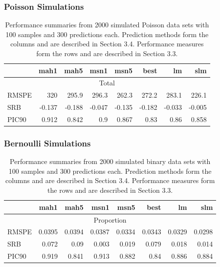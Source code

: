 \documentclass[mathserif,compress]{beamer}\usepackage{graphicx, color}
\begin{document}
\begin{frame}[fragile]
\frametitle{Poisson Simulations}


\begin{table}[ht]
\caption{\tiny Performance summaries from 2000 simulated Poisson data sets with 100 samples and 300 predictions each. Prediction methods form the columns and are described in Section 3.4.  Performance measures form the rows and are described in Section 3.3. \label{POISsummary}}
\scriptsize
\begin{center}
\begin{tabular}{|l r r r r r r r|}
\hline
\hline
  & mah1 & mah5 & msn1 & msn5 & best & lm & slm \\
\hline
\hline
\multicolumn{8}{|c|}{Total} \\
RMSPE & 320 & 295.9 & 296.3 & 262.3 & 272.2 & 283.1 & 226.1 \\
SRB & -0.137 & -0.188 & -0.047 & -0.135 & -0.182 & -0.033 & -0.005 \\
PIC90 & 0.912 & 0.842 & 0.9 & 0.867 & 0.83 & 0.86 & 0.858 \\
\hline
\end{tabular}
\end{center}
\end{table}%

\end{frame}

\begin{frame}[fragile]
\frametitle{Bernoulli Simulations}


\begin{table}[ht]
\caption{\tiny Performance summaries from 2000 simulated binary data sets with 100 samples and 300 predictions each. Prediction methods form the columns and are described in Section 3.4.  Performance measures form the rows and are described in Section 3.3. \label{BERNsummary}}
\scriptsize
\begin{center}
\begin{tabular}{|l r r r r r r r|}
\hline
\hline
  & mah1 & mah5 & msn1 & msn5 & best & lm & slm \\
\hline
\hline
\multicolumn{8}{|c|}{Proportion} \\
RMSPE & 0.0395 & 0.0394 & 0.0387 & 0.0334 & 0.0343 & 0.0329 & 0.0298 \\
SRB & 0.072 & 0.09 & 0.003 & 0.019 & 0.079 & 0.018 & 0.014 \\
PIC90 & 0.919 & 0.841 & 0.913 & 0.882 & 0.84 & 0.886 & 0.884 \\
\hline
\end{tabular}
\end{center}
\end{table}%
%

\end{frame}
\end{document}

